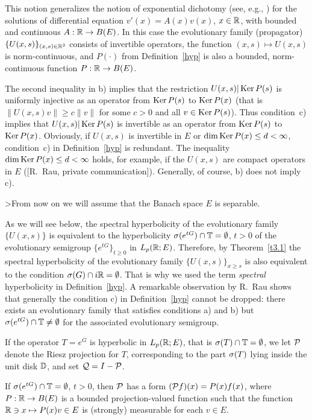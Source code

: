 This notion generalizes the notion of exponential dichotomy
(see, e.g.,
\cite{9}) for the
solutions of differential equation $v'(x) =A(x) v(x)$, $x\in{\Bbb{R}}$,
with bounded and continuous $A:{\Bbb{R}} \to B(E)$.
In this case the evolutionary family (propagator)
$\{U(x,s)\}_{(x,s)\in{\Bbb{R}}^2}$ consists of invertible operators,
the function $(x,s)
\mapsto U(x,s)$ is norm-continuous, and $P(\cdot)$ from
Definition~\ref{hyp} is also a
bounded, norm-continuous function $P:{\Bbb{R}} \to
B(E)$.

The second inequality in b) implies that
the restriction $U(x,s) | \operatorname{Ker} P(s)$ is
uniformly injective
as an operator from $\operatorname{Ker} P(s)$ to $\operatorname{Ker} P(x)$
(that is $\|U(x,s) v\| \geq c\|v\|$
for some $c> 0$
and all $v\in\operatorname{Ker} P(s)$).
Thus condition~c)
implies that $U(x,s) | \operatorname{Ker} P(s)$ is invertible as an operator from
$\operatorname{Ker} P(s)$ to $\operatorname{Ker} P(x)$.  Obviously, if $U(x,s)$ is
invertible in $E$ or
$\dim \operatorname{Ker} P(x) \leq d < \infty$, condition~c) in Definition~\ref{hyp} is
redundant. The inequality
$\dim \operatorname{Ker} P(x) \leq d < \infty$ holds,
for example, if the $U(x,s)$ are compact
operators in $E$ ([R.~Rau, private communication]).
Generally, of course, b) does not imply c).

>From now on we will assume that the Banach space $E$ is separable.

As we will see below,
the spectral hyperbolicity of the evolutionary
family $\{U(x,s)\}$ is equivalent
to the hyperbolicity $\sigma
(e^{tG} ) \cap {\Bbb{T}} =\emptyset$, $t> 0$ of the evolutionary semigroup
$\{e^{tG}\}_{t\geq 0}$ in $L_p ({\Bbb{R}};E)$.
Therefore, by Theorem~\ref{t3.1}
the spectral hyperbolicity of the evolutionary
family $\{U(x,s)\}_{x\geq s}$ is also equivalent
to the condition $\sigma (G) \cap i{\Bbb{R}} =\emptyset$.
That is why we used the term
{\it spectral} hyperbolicity in Definition~\ref{hyp}.  A remarkable
observation by R.~Rau \cite{27} shows that generally
the condition c) in
Definition~\ref{hyp} cannot be dropped: there exists an evolutionary
family that satisfies conditions a) and b) but $\sigma (e^{tG})\cap {\Bbb{T}}
\neq \emptyset$ for the associated evolutionary semigroup.


If the operator
$T=e^G$ is hyperbolic in $L_p ({\Bbb{R}};E)$, that is $\sigma (T) \cap {\Bbb{T}}
=\emptyset$, we let ${\cal{P}}$ denote the Riesz projection for $T$, corresponding to
the part $\sigma (T)$ lying
inside the unit disk ${\Bbb{D}}$, and set ${\cal{Q}} =I-{\cal{P}}$.

\begin{lem}
If $\sigma (e^{tG})\cap {\Bbb{T}} =\emptyset$, $t> 0$, then ${\cal{P}}$ has a form
$({\cal{P}} f)(x) =P(x)f(x)$, where $P:{\Bbb{R}} \to B(E)$ is a bounded
projection-valued function such that
the function ${\Bbb{R}} \ni x \mapsto P(x) v \in E$ is
(strongly) measurable for each $v\in E$.
\end{lem}

